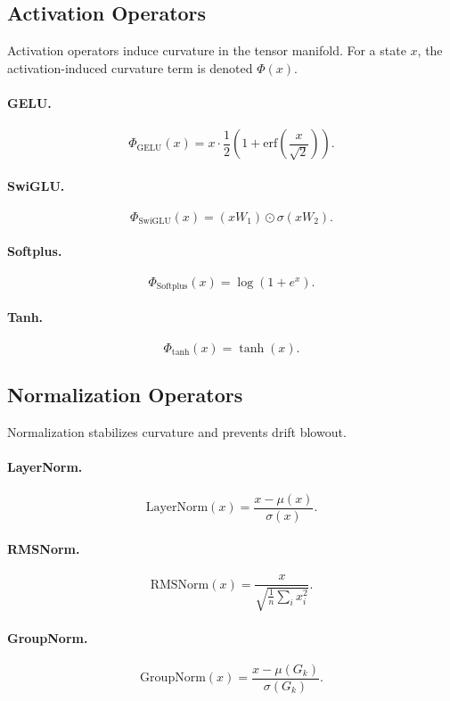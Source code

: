 \documentclass[11pt]{article}
\begin{document}
\subsection{Activation Operators}

Activation operators induce curvature in the tensor manifold. For a state $x$,
the activation-induced curvature term is denoted $\Phi(x)$.

\paragraph{GELU.}
\[
\Phi_{\text{GELU}}(x) =
x \cdot \frac{1}{2}\left(1 + \mathrm{erf}\left(\frac{x}{\sqrt{2}}\right)\right).
\]

\paragraph{SwiGLU.}
\[
\Phi_{\text{SwiGLU}}(x) = (xW_1) \odot \sigma(xW_2).
\]

\paragraph{Softplus.}
\[
\Phi_{\text{Softplus}}(x) = \log(1 + e^x).
\]

\paragraph{Tanh.}
\[
\Phi_{\tanh}(x) = \tanh(x).
\]

\subsection{Normalization Operators}

Normalization stabilizes curvature and prevents drift blowout.

\paragraph{LayerNorm.}
\[
\mathrm{LayerNorm}(x) = \frac{x - \mu(x)}{\sigma(x)}.
\]

\paragraph{RMSNorm.}
\[
\mathrm{RMSNorm}(x) = \frac{x}{\sqrt{\frac{1}{n}\sum_i x_i^2}}.
\]

\paragraph{GroupNorm.}
\[
\mathrm{GroupNorm}(x) = \frac{x - \mu(G_k)}{\sigma(G_k)}.
\]
\end{document}
